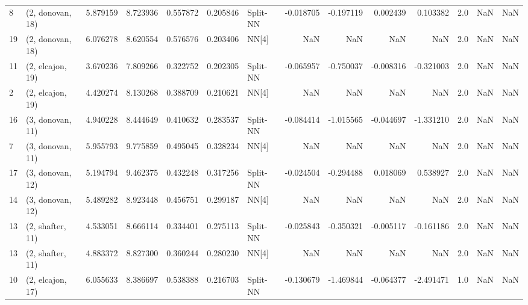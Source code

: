\begin{tabular}{llrrrrlrrrrrrl}
8  &  (2, donovan, 18) &   5.879159 &   8.723936 &   0.557872 &  0.205846 &    Split-NN &       -0.018705 &     -0.197119 &       0.002439 &     0.103382 &            2.0 &    NaN &              NaN \\
19 &  (2, donovan, 18) &   6.076278 &   8.620554 &   0.576576 &  0.203406 &       NN[4] &             NaN &           NaN &            NaN &          NaN &            2.0 &    NaN &              NaN \\
11 &  (2, elcajon, 19) &   3.670236 &   7.809266 &   0.322752 &  0.202305 &    Split-NN &       -0.065957 &     -0.750037 &      -0.008316 &    -0.321003 &            2.0 &    NaN &              NaN \\
2  &  (2, elcajon, 19) &   4.420274 &   8.130268 &   0.388709 &  0.210621 &       NN[4] &             NaN &           NaN &            NaN &          NaN &            2.0 &    NaN &              NaN \\
16 &  (3, donovan, 11) &   4.940228 &   8.444649 &   0.410632 &  0.283537 &    Split-NN &       -0.084414 &     -1.015565 &      -0.044697 &    -1.331210 &            2.0 &    NaN &              NaN \\
7  &  (3, donovan, 11) &   5.955793 &   9.775859 &   0.495045 &  0.328234 &       NN[4] &             NaN &           NaN &            NaN &          NaN &            2.0 &    NaN &              NaN \\
17 &  (3, donovan, 12) &   5.194794 &   9.462375 &   0.432248 &  0.317256 &    Split-NN &       -0.024504 &     -0.294488 &       0.018069 &     0.538927 &            2.0 &    NaN &              NaN \\
14 &  (3, donovan, 12) &   5.489282 &   8.923448 &   0.456751 &  0.299187 &       NN[4] &             NaN &           NaN &            NaN &          NaN &            2.0 &    NaN &              NaN \\
13 &  (2, shafter, 11) &   4.533051 &   8.666114 &   0.334401 &  0.275113 &    Split-NN &       -0.025843 &     -0.350321 &      -0.005117 &    -0.161186 &            2.0 &    NaN &              NaN \\
13 &  (2, shafter, 11) &   4.883372 &   8.827300 &   0.360244 &  0.280230 &       NN[4] &             NaN &           NaN &            NaN &          NaN &            2.0 &    NaN &              NaN \\
10 &  (2, elcajon, 17) &   6.055633 &   8.386697 &   0.538388 &  0.216703 &    Split-NN &       -0.130679 &     -1.469844 &      -0.064377 &    -2.491471 &            1.0 &    NaN &              NaN \\

\end{tabular}

